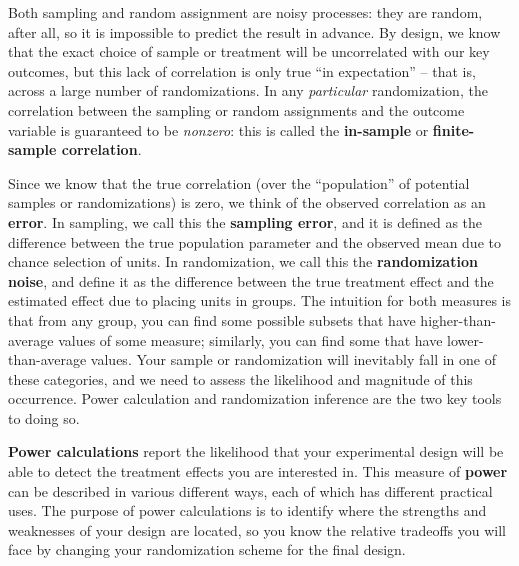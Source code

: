 Both sampling and random assignment are noisy processes:
they are random, after all, so it is impossible to predict the result in advance.
By design, we know that the exact choice of sample or treatment
will be uncorrelated with our key outcomes,
but this lack of correlation is only true ``in expectation'' --
that is, across a large number of randomizations.
In any \textit{particular} randomization,
the correlation between the sampling or random assignments and the outcome variable
is guaranteed to be \textit{nonzero}:
this is called the \textbf{in-sample} or \textbf{finite-sample correlation}.

Since we know that the true correlation
(over the ``population'' of potential samples or randomizations)
is zero, we think of the observed correlation as an \textbf{error}.
In sampling, we call this the \textbf{sampling error},
and it is defined as the difference between the true population parameter
and the observed mean due to chance selection of units.
In randomization, we call this the \textbf{randomization noise},
and define it as the difference between the true treatment effect
and the estimated effect due to placing units in groups.
The intuition for both measures is that from any group,
you can find some possible subsets that have higher-than-average values of some measure;
similarly, you can find some that have lower-than-average values.
Your sample or randomization will inevitably fall in one of these categories,
and we need to assess the likelihood and magnitude of this occurrence.
Power calculation and randomization inference are the two key tools to doing so.


\textbf{Power calculations} report the likelihood that your experimental design
will be able to detect the treatment effects you are interested in.
This measure of \textbf{power} can be described in various different ways,
each of which has different practical uses.
The purpose of power calculations is to identify where the strengths and weaknesses
of your design are located, so you know the relative tradeoffs you will face
by changing your randomization scheme for the final design.


